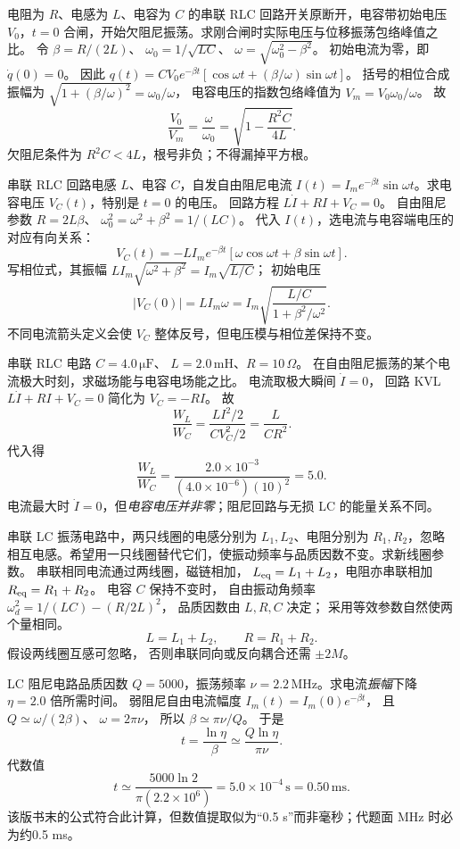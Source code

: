 电阻为 $R$、电感为 $L$、电容为 $C$ 的串联 RLC 回路开关原断开，电容带初始电压 $V_0$，$t=0$ 合闸，开始欠阻尼振荡。求刚合闸时实际电压与位移振荡包络峰值之比。
\exsolution
令 $\beta=R/(2L)$、
$\omega_0=1/\sqrt{LC}$、
$\omega=\sqrt{\omega_0^2-\beta^2}$。
初始电流为零，即 $\dot q(0)=0$。
因此
$q(t)=CV_0e^{-\beta t}
[\cos\omega t+(\beta/\omega)\sin\omega t]$。
括号的相位合成振幅为
$\sqrt{1+(\beta/\omega)^2}=\omega_0/\omega$，
电容电压的指数包络峰值为
$V_m=V_0\omega_0/\omega$。
故
\[
\boxed{\frac{V_0}{V_m}
=\frac{\omega}{\omega_0}
=\sqrt{1-\frac{R^2C}{4L}}}.
\]
\excheck 欠阻尼条件为 $R^2C<4L$，根号非负；不得漏掉平方根。

串联 RLC 回路电感 $L$、电容 $C$，自发自由阻尼电流
$I(t)=I_me^{-\beta t}\sin\omega t$。求电容电压 $V_C(t)$，特别是 $t=0$ 的电压。
\exsolution
回路方程
$L\dot I+RI+V_C=0$。
自由阻尼参数
$R=2L\beta$、
$\omega_0^2=\omega^2+\beta^2=1/(LC)$。
代入 $I(t)$，选电流与电容端电压的对应有向关系：
\[
\boxed{V_C(t)=
-LI_me^{-\beta t}
[\omega\cos\omega t+\beta\sin\omega t]}.
\]
写相位式，其振幅
$L I_m\sqrt{\omega^2+\beta^2}
=I_m\sqrt{L/C}$；
初始电压
\[
\boxed{|V_C(0)|=LI_m\omega
=I_m\sqrt{\frac{L/C}{1+\beta^2/\omega^2}}}.
\]
\excheck 不同电流箭头定义会使 $V_C$ 整体反号，但电压模与相位差保持不变。

串联 RLC 电路 $C=4.0\,\mathrm{\mu F}$、
$L=2.0\,\mathrm{mH}$、$R=10\,\Omega$。
在自由阻尼振荡的某个电流极大时刻，求磁场能与电容电场能之比。
\exsolution
电流取极大瞬间 $\dot I=0$，
回路 KVL
$L\dot I+RI+V_C=0$
简化为
$V_C=-RI$。
故
\[
\frac{W_L}{W_C}
=\frac{LI^2/2}{CV_C^2/2}
=\frac{L}{CR^2}.
\]
代入得
\[
\boxed{\frac{W_L}{W_C}
=\frac{2.0\times10^{-3}}
{(4.0\times10^{-6})(10)^2}=5.0}.
\]
\excheck 电流最大时 $\dot I=0$，但\emph{电容电压并非零}；阻尼回路与无损 LC 的能量关系不同。

串联 LC 振荡电路中，两只线圈的电感分别为 $L_1,L_2$、电阻分别为 $R_1,R_2$，忽略相互电感。希望用一只线圈替代它们，使振动频率与品质因数不变。求新线圈参数。
\exsolution
串联相同电流通过两线圈，磁链相加，
$L_{\rm eq}=L_1+L_2$，电阻亦串联相加
$R_{\rm eq}=R_1+R_2$。
电容 $C$ 保持不变时，
自由振动角频率
$\omega_d^2=1/(LC)-(R/2L)^2$，
品质因数由 $L,R,C$ 决定；
采用等效参数自然使两个量相同。
\[
\boxed{L=L_1+L_2,\qquad R=R_1+R_2}.
\]
\excheck 假设两线圈互感可忽略，
否则串联同向或反向耦合还需 $\pm2M$。

LC 阻尼电路品质因数 $Q=5000$，振荡频率
$\nu=2.2\,\mathrm{MHz}$。求电流\emph{振幅}下降 $\eta=2.0$ 倍所需时间。
\exsolution
弱阻尼自由电流幅度
$I_m(t)=I_m(0)e^{-\beta t}$，
且 $Q\simeq\omega/(2\beta)$、
$\omega=2\pi\nu$，
所以
$\beta\simeq\pi\nu/Q$。
于是
\[
\boxed{t=\frac{\ln\eta}{\beta}
\simeq\frac{Q\ln\eta}{\pi\nu}}.
\]
代数值
\[
\boxed{t\simeq\frac{5000\ln2}{\pi(2.2\times10^6)}
=5.0\times10^{-4}\,\mathrm s=0.50\,\mathrm{ms}}.
\]
\excheck 该版书末的公式符合此计算，但数值提取似为“0.5 s”而非毫秒；代题面 MHz 时必为约0.5 ms。

